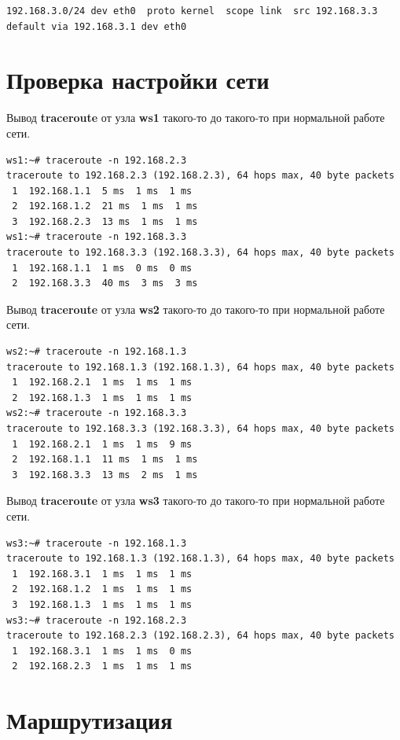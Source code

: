 \documentclass[a4paper,12pt]{article}
\begin{document}
\begin{Verbatim}
192.168.3.0/24 dev eth0  proto kernel  scope link  src 192.168.3.3 
default via 192.168.3.1 dev eth0 
\end{Verbatim}

\section{Проверка настройки сети}

Вывод \textbf{traceroute} от узла \textbf{ws1} такого-то до такого-то при нормальной работе сети.

\begin{Verbatim}
ws1:~# traceroute -n 192.168.2.3
traceroute to 192.168.2.3 (192.168.2.3), 64 hops max, 40 byte packets
 1  192.168.1.1  5 ms  1 ms  1 ms
 2  192.168.1.2  21 ms  1 ms  1 ms
 3  192.168.2.3  13 ms  1 ms  1 ms
ws1:~# traceroute -n 192.168.3.3
traceroute to 192.168.3.3 (192.168.3.3), 64 hops max, 40 byte packets
 1  192.168.1.1  1 ms  0 ms  0 ms
 2  192.168.3.3  40 ms  3 ms  3 ms
\end{Verbatim}

Вывод \textbf{traceroute} от узла \textbf{ws2} такого-то до такого-то при нормальной работе сети.

\begin{Verbatim}
ws2:~# traceroute -n 192.168.1.3
traceroute to 192.168.1.3 (192.168.1.3), 64 hops max, 40 byte packets
 1  192.168.2.1  1 ms  1 ms  1 ms
 2  192.168.1.3  1 ms  1 ms  1 ms
ws2:~# traceroute -n 192.168.3.3
traceroute to 192.168.3.3 (192.168.3.3), 64 hops max, 40 byte packets
 1  192.168.2.1  1 ms  1 ms  9 ms
 2  192.168.1.1  11 ms  1 ms  1 ms
 3  192.168.3.3  13 ms  2 ms  1 ms
\end{Verbatim}

Вывод \textbf{traceroute} от узла \textbf{ws3} такого-то до такого-то при нормальной работе сети.

\begin{Verbatim}
ws3:~# traceroute -n 192.168.1.3
traceroute to 192.168.1.3 (192.168.1.3), 64 hops max, 40 byte packets
 1  192.168.3.1  1 ms  1 ms  1 ms
 2  192.168.1.2  1 ms  1 ms  1 ms
 3  192.168.1.3  1 ms  1 ms  1 ms
ws3:~# traceroute -n 192.168.2.3
traceroute to 192.168.2.3 (192.168.2.3), 64 hops max, 40 byte packets
 1  192.168.3.1  1 ms  1 ms  0 ms
 2  192.168.2.3  1 ms  1 ms  1 ms
\end{Verbatim}


\section{Маршрутизация}
\end{document}
